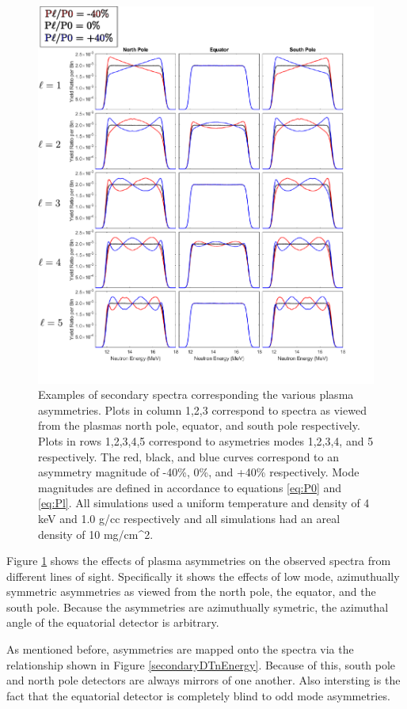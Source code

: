 	\begin{figure}[h!]
	    \centering
	    \includegraphics[scale=0.8]{Figures/secondaryDTAsymExamples.pdf}
	    \caption[Asymmetry Effects on Spectra]{Examples of secondary spectra corresponding the various plasma asymmetries. Plots in column 1,2,3 correspond to spectra as viewed from the plasmas north pole, equator, and south pole respectively. Plots in rows 1,2,3,4,5 correspond to asymetries modes 1,2,3,4, and 5 respectively. The red, black, and blue curves correspond to an asymmetry magnitude of -40\%, 0\%, and +40\% respectively. Mode magnitudes are defined in accordance to equations \ref{eq:P0} and \ref{eq:Pl}. All simulations used a uniform temperature and density of 4 keV and 1.0 g/cc respectively and all simulations had an areal density of 10 mg/cm^2. }
	    \label{fig:secondaryDTAsymExamples}
	\end{figure}
	
	    Figure \ref{fig:secondaryDTAsymExamples} shows the effects of plasma asymmetries on the observed spectra from different lines of sight. Specifically it shows the effects of low mode, azimuthually symmetric asymmetries as viewed from the north pole, the equator, and the south pole. Because the asymmetries are azimuthually symetric, the azimuthal angle of the equatorial detector is arbitrary. 
	    
	    
	    As mentioned before, asymmetries are mapped onto the spectra via the relationship shown in Figure \ref{secondaryDTnEnergy}. Because of this, south pole and north pole detectors are always mirrors of one another. Also intersting is the fact that the equatorial detector is completely blind to odd mode asymmetries. 
	
	
